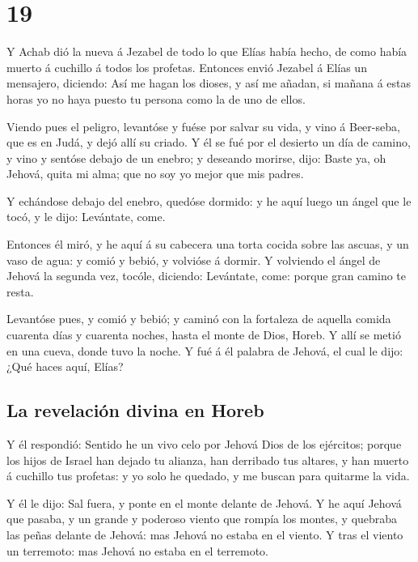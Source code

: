 \hypertarget{section-18}{%
\section{19}\label{section-18}}

 Y Achab dió la nueva á Jezabel de todo lo que Elías había
hecho, de como había muerto á cuchillo á todos los profetas.
 Entonces envió Jezabel á Elías un mensajero, diciendo:
Así me hagan los dioses, y así me añadan, si mañana á estas horas yo no
haya puesto tu persona como la de uno de ellos.

 Viendo pues el peligro, levantóse y fuése por salvar su
vida, y vino á Beer-seba, que es en Judá, y dejó allí su criado.
 Y él se fué por el desierto un día de camino, y vino y
sentóse debajo de un enebro; y deseando morirse, dijo: Baste ya, oh
Jehová, quita mi alma; que no soy yo mejor que mis padres.

 Y echándose debajo del enebro, quedóse dormido: y he aquí
luego un ángel que le tocó, y le dijo: Levántate, come.

 Entonces él miró, y he aquí á su cabecera una torta
cocida sobre las ascuas, y un vaso de agua: y comió y bebió, y volvióse
á dormir.  Y volviendo el ángel de Jehová la segunda vez,
tocóle, diciendo: Levántate, come: porque gran camino te resta.

 Levantóse pues, y comió y bebió; y caminó con la
fortaleza de aquella comida cuarenta días y cuarenta noches, hasta el
monte de Dios, Horeb.  Y allí se metió en una cueva, donde
tuvo la noche. Y fué á él palabra de Jehová, el cual le dijo: ¿Qué haces
aquí, Elías?

\hypertarget{la-revelaciuxf3n-divina-en-horeb}{%
\subsection{La revelación divina en
Horeb}\label{la-revelaciuxf3n-divina-en-horeb}}

 Y él respondió: Sentido he un vivo celo por Jehová Dios
de los ejércitos; porque los hijos de Israel han dejado tu alianza, han
derribado tus altares, y han muerto á cuchillo tus profetas: y yo solo
he quedado, y me buscan para quitarme la vida.

 Y él le dijo: Sal fuera, y ponte en el monte delante de
Jehová. Y he aquí Jehová que pasaba, y un grande y poderoso viento que
rompía los montes, y quebraba las peñas delante de Jehová: mas Jehová no
estaba en el viento. Y tras el viento un terremoto: mas Jehová no estaba
en el terremoto.

